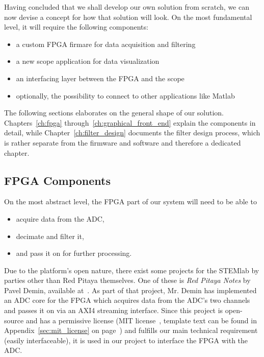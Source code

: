 Having concluded that  we shall develop our own solution  from scratch, we can
now devise a concept for how that solution will look.  On the most fundamental
level, it will require the following components:
\begin{itemize}
    \item
        a custom FPGA firmare for data acquisition and filtering
    \item
        a new scope application for data visualization
    \item
        an interfacing layer between the FPGA and the scope
    \item
        optionally, the possibility to connect to other applications like Matlab
\end{itemize}
The   following   sections   elaborates   on  the   general   shape   of   our
solution. Chapters~\ref{ch:fpga}  through~\ref{ch:graphical_front_end} explain
the components  in detail, while Chapter~\ref{ch:filter_design}  documents the
filter design process, which is rather separate from the firmware and software
and therefore a dedicated chapter.

%
%
\subsection{FPGA Components} %
\label{subsec:concept:fpga_components}

On the most abstract level, the FPGA part of our system will need to be able to
\begin{itemize}\tightlist
    \item
        acquire data from the ADC,
    \item
        decimate and filter it,
    \item
        and pass it on for further processing.
\end{itemize}

Due to the  platform's open nature, there exist some  projects for the STEMlab
by parties other than Red Pitaya  themselves. One of these is \emph{Red Pitaya
Notes} by  Pavel Demin, available  at~\cite{pita:github:pitaya-notes}. As part
of that  project, Mr. Demin  has implemented  an ADC core  for the  FPGA which
acquires  data from  the ADC's  two  channels and  passes  it on  via an  AXI4
streaming interface\footnotemark.
Since   this   project  is   open-source   and   has  a   permissive   license
(MIT   license~\cite{licenses:mit},   template   text    can   be   found   in
Appendix~\ref{sec:mit_license} on page~\pageref{sec:mit_license}) and fulfills
our  main technical  requirement (easily  interfaceable),  it is  used in  our
project to interface the FPGA with the ADC.

